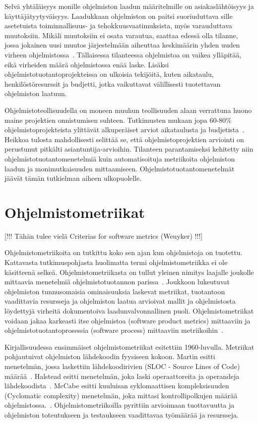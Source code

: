 \documentclass[finnish]{tktltiki2}
\theoremstyle{definition}
\theoremstyle{remark}
\begin{document}
Selvä yhtäläisyys monille ohjelmiston laadun määritelmille on asiakaslähtöisyys ja käyttäjätyytyväisyys. Laadukkaan ohjelmiston on paitsi suoriuduttava sille asetetuista toiminnallisuus- ja tehokkuusvaatimuksista, myös varauduttava muutoksiin. Mikäli muutoksiin ei osata varautua, saattaa edessä olla tilanne, jossa jokainen uusi muutos järjestelmään aiheuttaa keskimäärin yhden uuden virheen ohjelmistossa~\cite{LB85}. Tällaisessa tilanteessa ohjelmistoa on vaikea ylläpitää, eikä virheiden määrä ohjelmistossa enää laske. Lisäksi ohjelmistotuotantoprojekteissa on ulkoisia tekijöitä, kuten aikataulu, henkilöstöresurssit ja budjetti, jotka vaikuttavat välillisesti tuotettavan ohjelmiston laatuun.

Ohjelmistoteollisuudella on moneen muuhun teollisuuden alaan verrattuna huono maine projektien onnistumisen suhteen. Tutkimusten mukaan jopa 60-80\% ohjelmistoprojekteista ylittävät alkuperäiset arviot aikataulusta ja budjetista~\cite{MJ03}. Heikkoa tulosta mahdollisesti selittää se, että ohjelmistoprojektien arviointi on perustunut pitkälti asiantuntija-arvioihin. Tilanteen parantamiseksi kehitetty niin ohjelmistotuotantomenetelmiä kuin automatisoituja metriikoita ohjelmiston laadun ja monimutkaisuuden mittaamiseen. Ohjelmistotuotantomenetelmät jäävät tämän tutkielman aiheen ulkopuolelle.

\section{Ohjelmistometriikat}

[!!! Tähän tulee vielä Criterias for software metrics (Weuyker) !!!]\newline

Ohjelmistometriikoita on tutkittu koko sen ajan kun ohjelmistoja on tuotettu. Kattavasta tutkimuspohjasta huolimatta termi ohjelmistometriikka ei ole käsitteenä selkeä. Ohjelmistometriikasta on tullut yleinen nimitys laajalle joukolle mittaavia menetelmiä ohjelmistotuotannon parissa~\cite{FM00}. Joukkoon lukeutuvat ohjelmiston tunnusomaisia ominaisuuksia laskevat metriikat, tuotantoon vaadittavia resursseja ja ohjelmiston laatua arvioivat mallit ja ohjelmistosta löydettyjä virheitä dokumentoiva laadunvalvonnallinen puoli. Ohjelmistometriikat voidaan jakaa karkeasti itse ohjelmistoa (software product metrics) mittaaviin ja ohjelmistotuotantoprosessia (software process) mittaaviin metriikoihin~\cite{LH93}.

Kirjallisuudessa ensimmäiset ohjelmistometriikat esitettiin 1960-luvulla. Metriikat pohjautuivat ohjelmiston lähdekoodin fyysiseen kokoon. Martin esitti menetelmän, jossa laskettiin lähdekoodirivien (SLOC - Source Lines of Code) määrää~\cite{M65}. Halstead esitti menetelmän, joka laski operaattoreita ja operandeja lähdekoodista~\cite{H72, H77}. McCabe esitti kuuluisan syklomaattisen kompleksisuuden (Cyclomatic complexity) menetelmän, joka mittasi kontrollipolkujen määrää ohjelmistossa.~\cite{M76}. Ohjelmistometriikoilla pyrittiin arvioimaan tuottavuutta ja ohjelmiston toteutukseen ja testaukseen vaadittavaa työmäärää ja resursseja.
\end{document}
